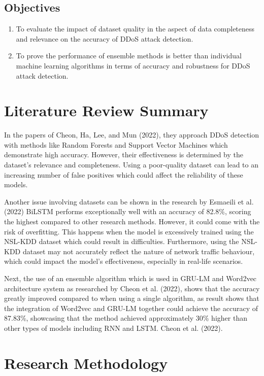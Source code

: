 \documentclass[a4paper, 12pt]{article}
\begin{document}
\subsection{Objectives}
\begin{enumerate}
  \item To evaluate the impact of dataset quality in the aspect of data completeness and relevance on the accuracy of DDoS attack detection.
  \item To prove the performance of ensemble methods is better than individual machine learning algorithms in terms of accuracy and robustness for DDoS attack detection. 
\end{enumerate}

\section{Literature Review Summary}

In the papers of Cheon, Ha, Lee, and Mun (2022), they approach DDoS detection with methods like Random Forests and Support Vector Machines which demonstrate high accuracy. However, their effectiveness is determined by the dataset's relevance and completeness. Using a poor-quality dataset can lead to an increasing number of false positives which could affect the reliability of these models.

Another issue involving datasets can be shown in the research by Esmaeili et al. (2022)
BiLSTM performs exceptionally well with an accuracy of 82.8\%, scoring the highest compared to other research methods. However, it could come with the risk of overfitting. This happens when the model is excessively trained using the NSL-KDD dataset which could result in difficulties. Furthermore, using the NSL-KDD dataset may not accurately reflect the nature of network traffic behaviour, which could impact the model's effectiveness, especially in real-life scenarios.

 Next, the use of an ensemble algorithm which is used in GRU-LM  and Word2vec architecture system as researched by Cheon et al. (2022), shows that the accuracy greatly improved compared to when using a single algorithm, as result shows that the integration of Word2vec and GRU-LM together could achieve the accuracy of 87.83\%, showcasing that the method achieved approximately 30\% higher than other types of models including RNN and LSTM. Cheon et al. (2022).

\clearpage

\section{Research Methodology}
\end{document}
